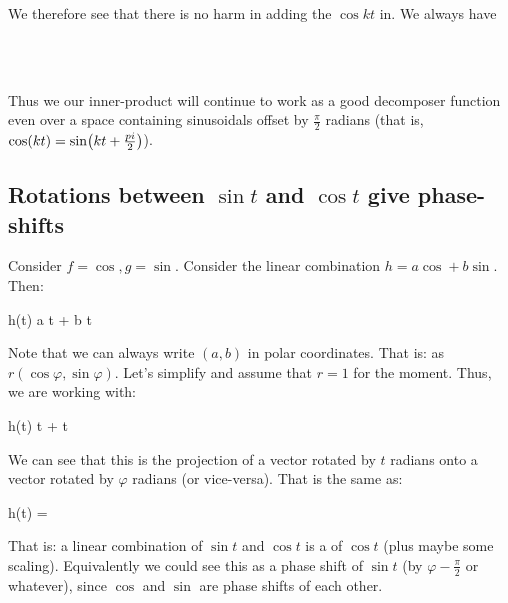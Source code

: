 \noindent
We therefore see that there is no harm in adding the $\cos kt$ in. We
always have

\begin{nedqn}
   
\\
 
\\
   
\end{nedqn}

Thus we our inner-product will continue to work as a good decomposer
function even over a space containing sinusoidals offset by
$\frac{\pi}{2}$ radians (that is, $\cos\mathopen{}\left( {kt} \right)\mathclose{} = \sin\mathopen{}\left( {kt +
\frac{pi}{2}} \right)\mathclose{}$).

\subsection{Rotations between $\sin t$ and $\cos t$ give phase-shifts}

Consider $f = \cos, g = \sin$. Consider the linear combination
$h = a \cos + b \sin$. Then:

\begin{nedqn}
  h(t)
\eqcol
  a \cos t + b \sin t
\end{nedqn}

\noindent
Note that we can always write $(a, b)$ in polar coordinates. That is: as
$r(\cos \varphi, \sin \varphi)$. Let's simplify and assume that $r = 1$
for the moment. Thus, we are working with:

\begin{nedqn}
  h(t)
\eqcol
  \cos\varphi \cos t + \sin\varphi \sin t
\end{nedqn}

\noindent
We can see that this is the projection of a vector rotated by $t$
radians onto a vector rotated by $\varphi$ radians (or vice-versa).
That is the same as:

\begin{nedqn}
  h(t)
\eqcol
  \cos{}
=
  \cos{}
\end{nedqn}

\noindent
That is: a linear combination of $\sin t$ and $\cos t$ is a
 of $\cos t$ (plus maybe some scaling). Equivalently
we could see this as a phase shift of $\sin t$ (by $\varphi -
\frac{\pi}{2}$ or whatever), since $\cos$ and $\sin$ are phase shifts of
each other.


